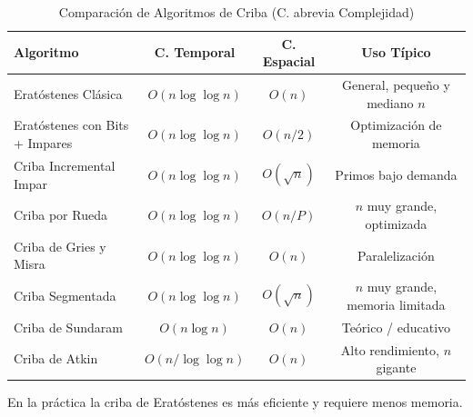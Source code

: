 \begin{table}[h!]
\centering
\caption{Comparación de Algoritmos de Criba (C. abrevia Complejidad)}
\label{tab:cribas}
\begin{tabular}{|l|c|c|c|}
\hline
\textbf{Algoritmo} & \textbf{C. Temporal} & \textbf{C. Espacial} & \textbf{Uso Típico} \\
\hline
Eratóstenes Clásica & \(O(n \log \log n)\) & \(O(n)\) & General, pequeño y mediano \(n\) \\
\hline
Eratóstenes con Bits + Impares & \(O(n \log \log n)\) & \(O(n/2)\) & Optimización de memoria \\
\hline
Criba Incremental Impar & \(O(n \log \log n)\) & \(O(\sqrt{n})\) & Primos bajo demanda \\
\hline
Criba por Rueda & \(O(n \log \log n)\) & \(O(n / P)\) & \(n\) muy grande, optimizada \\
\hline
Criba de Gries y Misra & \(O(n \log \log n)\) & \(O(n)\) & Paralelización \\
\hline
Criba Segmentada & \(O(n \log \log n)\) & \(O(\sqrt{n})\) & \(n\) muy grande, memoria limitada \\
\hline
Criba de Sundaram & \(O(n \log n)\) & \(O(n)\) & Teórico / educativo \\
\hline
Criba de Atkin & \(O(n / \log \log n)\) & \(O(n)\) & Alto rendimiento, \(n\) gigante \\
\hline
\end{tabular}
\end{table}

En la práctica la criba de Eratóstenes es más eficiente y requiere menos memoria.